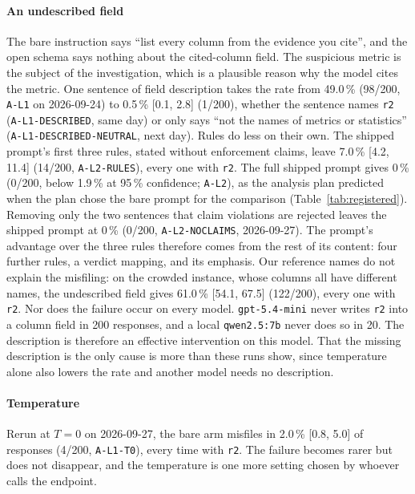 \documentclass[10pt,twocolumn]{article}
\begin{document}
\paragraph{An undescribed field}
The bare instruction says ``list every column from the evidence you cite'',
and the open schema says nothing about the cited-column field. The suspicious
metric is the subject of the investigation, which is a plausible reason why
the model cites the metric. One sentence of field description takes the rate
from 49.0\,\% (98/200, \texttt{A-L1} on 2026-09-24) to 0.5\,\% [0.1, 2.8]
(1/200), whether the sentence names \texttt{r2} (\texttt{A-L1-DESCRIBED}, same
day) or only says ``not the names of metrics or statistics''
(\texttt{A-L1-DESCRIBED-NEUTRAL}, next day). Rules do less on their own. The
shipped prompt's first three rules, stated without enforcement claims, leave
7.0\,\% [4.2, 11.4] (14/200, \texttt{A-L2-RULES}), every one with
\texttt{r2}. The full shipped prompt gives 0\,\% (0/200, below 1.9\,\% at
95\,\% confidence; \texttt{A-L2}), as the analysis plan predicted when the
plan chose the bare prompt for the comparison (Table~\ref{tab:registered}).
Removing only the two sentences that claim violations are rejected leaves the
shipped prompt at 0\,\% (0/200, \texttt{A-L2-NOCLAIMS}, 2026-09-27). The
prompt's advantage over the three rules therefore comes from the rest of its
content: four further rules, a verdict mapping, and its emphasis. Our
reference names do not explain the misfiling: on the crowded instance, whose
columns all have different names, the undescribed field gives 61.0\,\% [54.1,
67.5] (122/200), every one with \texttt{r2}. Nor does the failure occur on
every model. \texttt{gpt-5.4-mini} never writes \texttt{r2} into a column
field in 200 responses, and a local \texttt{qwen2.5:7b} never does so in 20.
The description is therefore an effective intervention on this model. That
the missing description is the only cause is more than these runs show, since
temperature alone also lowers the rate and another model needs no
description.

\paragraph{Temperature}
Rerun at $T=0$ on 2026-09-27, the bare arm misfiles in 2.0\,\% [0.8, 5.0] of
responses (4/200, \texttt{A-L1-T0}), every time with \texttt{r2}. The failure
becomes rarer but does not disappear, and the temperature is one more setting
chosen by whoever calls the endpoint.
\end{document}
